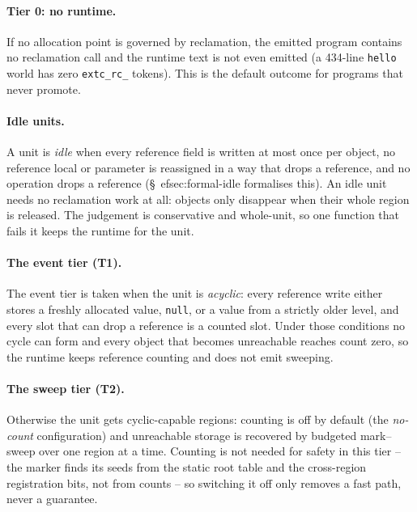 \paragraph{Tier 0: no runtime.}
If no allocation point is governed by reclamation, the emitted program contains no reclamation call
and the runtime text is not even emitted (a 434-line \texttt{hello} world has zero
\texttt{extc\_rc\_} tokens). This is the default outcome for programs that never promote.

\paragraph{Idle units.}
A unit is \emph{idle} when every reference field is written at most once per object, no reference
local or parameter is reassigned in a way that drops a reference, and no operation drops a
reference (\S\
ef{sec:formal-idle} formalises this).
An idle unit needs no reclamation work at all: objects only disappear when their whole region is
released. The judgement is conservative and whole-unit, so one function that fails it keeps the
runtime for the unit.

\paragraph{The event tier (T1).}
The event tier is taken when the unit is \emph{acyclic}: every reference write either stores a
freshly allocated value, \texttt{null}, or a value from a strictly older level, and every slot that
can drop a reference is a counted slot.
Under those conditions no cycle can form and every object that becomes unreachable reaches count
zero, so the runtime keeps reference counting and does not emit sweeping.

\paragraph{The sweep tier (T2).}
Otherwise the unit gets cyclic-capable regions: counting is off by default (the
\emph{no-count} configuration) and unreachable storage is recovered by budgeted mark--sweep over one
region at a time.
Counting is not needed for safety in this tier -- the marker finds its seeds from the static root
table and the cross-region registration bits, not from counts -- so switching it off only removes a
fast path, never a guarantee.

